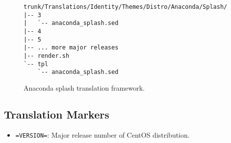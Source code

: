 \begin{figure}
\hrulefill
\begin{verbatim}
trunk/Translations/Identity/Themes/Distro/Anaconda/Splash/
|-- 3
|   `-- anaconda_splash.sed
|-- 4
|-- 5
|-- ... more major releases
|-- render.sh
`-- tpl
    `-- anaconda_splash.sed
\end{verbatim}
\hrulefill
\caption{Anaconda splash translation framework.%
   \label{fig:Distribution:Anaconda:Splash:Translations}}
\end{figure}

\subsection{Translation Markers}
\hypertarget{sec:Distribution:Anaconda:Splash:Translations:Markers}{}
\label{sec:Distribution:Anaconda:Splash:Translations:Markers}

\begin{itemize}
\item \texttt{=VERSION=}: Major release number of CentOS distribution.
\end{itemize}


